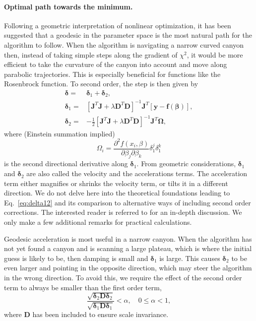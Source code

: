 \documentclass{article}
\begin{document}
\paragraph{Optimal path towards the minimum.} Following a geometric interpretation of nonlinear optimization, it has been suggested that a geodesic in the parameter space is the most natural path for the algorithm to follow. When the algorithm is navigating a narrow curved canyon then, instead of taking simple steps along the gradient of $\chi^2$, it would be more efficient to take the curvature of the canyon into account and move along parabolic trajectories. This is especially beneficial for functions like the Rosenbrock function. To second order, the step is then given by
\begin{equation}
  \label{eq:delta12}
  \begin{split}
    \bm\delta =& \bm\delta_1 + \bm\delta_2, \\
    \bm\delta_1 =& \left[ \bm J^T \bm J + \lambda\bm D^T\bm D
    \right]^{-1} \bm J^T \left[ \bm y - \bm f(\bm\beta) \right], \\
    \bm\delta_2 =& -\frac{1}{2} \left[ \bm J^T \bm J + \lambda\bm
      D^T\bm D\right]^{-1} \bm J^T \bm\Omega,
  \end{split}
\end{equation}
where (Einstein summation implied)
\begin{equation}
  \label{eq:omega}
  \Omega_i = \frac{\partial^2
    f(x_i,\beta)}{\partial\beta_j \partial\beta_k} \delta_1^j
  \delta_1^k
\end{equation}
is the second directional derivative along $\bm\delta_1$. From geometric considerations, $\bm\delta_1$ and $\bm\delta_2$ are also called the velocity and the accelerations terms. The acceleration term either magnifies or shrinks the velocity term, or tilts it in a different direction. We do not delve here into the theoretical foundations leading to Eq.~\eqref{eq:delta12} and its comparison to alternative ways of including second order corrections. The interested reader is referred to \cite{transtrum10, transtrum11, transtrum12} for an in-depth discussion. We only make a few additional remarks for practical calculations.

Geodesic acceleration is most useful in a narrow canyon. When the algorithm has not yet found a canyon and is scanning a large plateau, which is where the initial guess is likely to be, then damping is small and $\bm\delta_1$ is large. This causes $\bm\delta_2$ to be even larger and pointing in the opposite direction, which may steer the algorithm in the wrong direction. To avoid this, we require the effect of the second order term to always be smaller than the first order term,
\begin{equation}
  \label{eq:acc_alpha}
  \frac{\sqrt{\bm\delta_2\bm D\bm\delta_2}}{\sqrt{\bm\delta_1\bm
      D\bm\delta_1}} < \alpha, \quad 0 \le \alpha < 1,
\end{equation}
where $\bm D$ has been included to ensure scale invariance.
\end{document}
